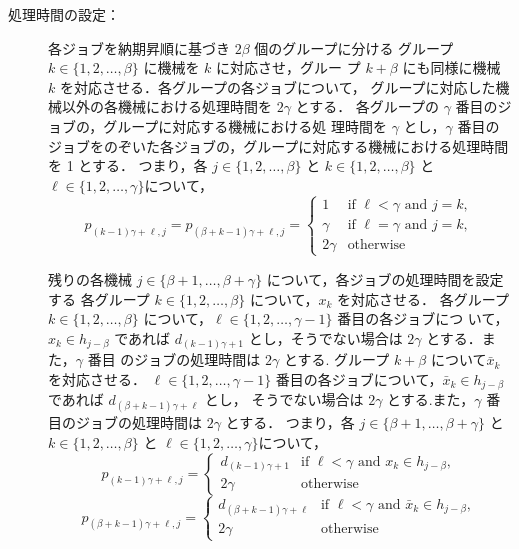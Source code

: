 \documentclass[12pt]{optlab-bachelor}
\begin{document}
\begin{description}
\begin{displaymath}
  \end{displaymath}
  \item[処理時間の設定：] 各ジョブを納期昇順に基づき $2\beta$ 個のグループに分ける
  グループ $k \in \{1,2,\ldots,\beta\}$ に機械を $k$ に対応させ，グルー
  プ $k + \beta$ にも同様に機械 $k$ を対応させる．各グループの各ジョブについて， グループに対応した機械以外の各機械における処理時間を $2\gamma$ とする．
  各グループの $\gamma$ 番目のジョブの，グループに対応する機械における処
  理時間を $\gamma$ とし，$\gamma$ 番目のジョブをのぞいた各ジョブの，グループに対応する機械における処理時間を 1 とする．
  つまり，各 $j \in \{1,2,\ldots, \beta\}$ と $k \in \{1,2,\ldots,
  \beta\}$ と $\ell \in \{1,2,\ldots, \gamma\}$について，
  \begin{displaymath}
    p_{(k - 1)\gamma + \ell, j} = p_{(\beta + k - 1)\gamma + \ell, j} = \left\{ \begin{array}{ll} 1 & \text{if } \ell < \gamma \text{ and } j = k, \\ \gamma & \text{if } \ell = \gamma \text{ and } j = k, \\ 2\gamma & \text{otherwise}\end{array} \right.
  \end{displaymath}

  残りの各機械 $j \in \{\beta + 1, \ldots , \beta + \gamma\}$ について，各ジョブの処理時間を設定する
  各グループ $k \in \{1,2,\ldots,\beta\}$ について，$x_k$ を対応させる．
  各グループ $k \in \{1,2,\ldots,\beta\}$ について，$\ell \in \{1,2,\ldots, \gamma - 1\}$ 番目の各ジョブにつ いて，$x_k \in h_{j - \beta}$ であれば $d_{(k - 1)\gamma + 1}$ とし，そうでない場合は $2\gamma$ とする．また，$\gamma$ 番目 のジョブの処理時間は $2\gamma$ とする.
  グループ $k + \beta$ について$\bar x_k$ を対応させる．
  $\ell \in \{1,2,\ldots, \gamma - 1\}$ 番目の各ジョブについて，$\bar x_k \in h_{j - \beta}$ であれば $d_{(\beta + k - 1)\gamma + \ell}$ とし， そうでない場合は $2\gamma$ とする.また，$\gamma$ 番目のジョブの処理時間は $2\gamma$ とする．
  つまり，各 $j \in \{\beta + 1,\ldots, \beta + \gamma\}$ と $k \in
  \{1,2,\ldots, \beta\}$ と $\ell \in \{1,2,\ldots, \gamma\}$について，
  \begin{displaymath}
    p_{(k - 1)\gamma + \ell, j} = \left\{ \begin{array}{ll} d_{(k - 1)\gamma + 1} & \text{if } \ell < \gamma \text{ and } x_k \in h_{j - \beta}, \\ 2\gamma & \text{otherwise} \end{array} \right.
  \end{displaymath}
  \begin{displaymath}
    p_{(\beta + k - 1)\gamma + \ell, j} = \left\{ \begin{array}{ll} d_{(\beta + k - 1)\gamma + \ell} & \text{if } \ell < \gamma \text{ and } \bar x_k \in h_{j - \beta}, \\ 2\gamma & \text{otherwise} \end{array} \right.
  \end{displaymath}
\end{description}
\end{document}
